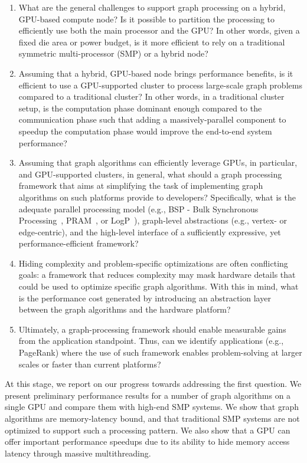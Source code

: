 \begin{enumerate}
\item What are the general challenges to support graph processing on a hybrid, GPU-based compute node? Is it possible to partition the processing to efficiently use both the main processor and the GPU? In other words, given a fixed die area or power budget, is it more efficient to rely on a traditional symmetric multi-processor (SMP) or a hybrid node?

\item Assuming that a hybrid, GPU-based node brings performance benefits, is it efficient to use a GPU-supported cluster to process large-scale graph problems compared to a traditional cluster? In other words, in a traditional cluster setup, is the computation phase dominant enough compared to the communication phase such that adding a massively-parallel component to speedup the computation phase would improve the end-to-end system performance?

\item Assuming that graph algorithms can efficiently leverage GPUs, in particular, and GPU-supported clusters, in general, what should a graph processing framework that aims at simplifying the task of implementing graph algorithms on such platforms provide to developers? Specifically, what is the adequate parallel processing model (e.g., BSP - Bulk Synchronous Processing~\cite{Valiant1990}, PRAM~\cite{Fortune78}, or LogP~\cite{Culler1996}), graph-level abstractions (e.g., vertex- or edge-centric), and the high-level interface of a sufficiently expressive, yet performance-efficient framework?

\item Hiding complexity and problem-specific optimizations are often conflicting goals: a framework that reduces complexity may mask hardware details that could be used to optimize specific graph algorithms. With this in mind, what is the performance cost generated by introducing an abstraction layer between the graph algorithms and the hardware platform?

\item Ultimately, a graph-processing framework should enable measurable gains from the application standpoint. Thus, can we identify applications (e.g., PageRank) where the use of such framework enables problem-solving at larger scales or faster than current platforms?

\end{enumerate}

At this stage, we report on our progress towards addressing the first question. We present preliminary performance results for a number of graph algorithms on a single GPU and compare them with high-end SMP systems. We show that graph algorithms are memory-latency bound, and that traditional SMP systems are not optimized to support such a processing pattern. We also show that a GPU can offer important performance speedups due to its ability to hide memory access latency through massive multithreading.

